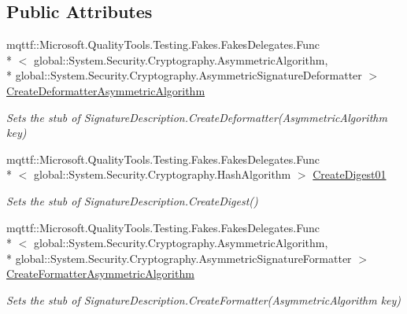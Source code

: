 \subsection*{Public Attributes}
\begin{DoxyCompactItemize}
\item 
mqttf\-::\-Microsoft.\-Quality\-Tools.\-Testing.\-Fakes.\-Fakes\-Delegates.\-Func\\*
$<$ global\-::\-System.\-Security.\-Cryptography.\-Asymmetric\-Algorithm, \\*
global\-::\-System.\-Security.\-Cryptography.\-Asymmetric\-Signature\-Deformatter $>$ \hyperlink{class_system_1_1_security_1_1_cryptography_1_1_fakes_1_1_stub_signature_description_a83e0e5fa60418e395a7f59d61f01202b}{Create\-Deformatter\-Asymmetric\-Algorithm}
\begin{DoxyCompactList}\small\item\em Sets the stub of Signature\-Description.\-Create\-Deformatter(\-Asymmetric\-Algorithm key)\end{DoxyCompactList}\item 
mqttf\-::\-Microsoft.\-Quality\-Tools.\-Testing.\-Fakes.\-Fakes\-Delegates.\-Func\\*
$<$ global\-::\-System.\-Security.\-Cryptography.\-Hash\-Algorithm $>$ \hyperlink{class_system_1_1_security_1_1_cryptography_1_1_fakes_1_1_stub_signature_description_aef788a57d55e71b0c70f314ba74da70d}{Create\-Digest01}
\begin{DoxyCompactList}\small\item\em Sets the stub of Signature\-Description.\-Create\-Digest()\end{DoxyCompactList}\item 
mqttf\-::\-Microsoft.\-Quality\-Tools.\-Testing.\-Fakes.\-Fakes\-Delegates.\-Func\\*
$<$ global\-::\-System.\-Security.\-Cryptography.\-Asymmetric\-Algorithm, \\*
global\-::\-System.\-Security.\-Cryptography.\-Asymmetric\-Signature\-Formatter $>$ \hyperlink{class_system_1_1_security_1_1_cryptography_1_1_fakes_1_1_stub_signature_description_a9e4452ad47edd91e123a848cdbf202e6}{Create\-Formatter\-Asymmetric\-Algorithm}
\begin{DoxyCompactList}\small\item\em Sets the stub of Signature\-Description.\-Create\-Formatter(\-Asymmetric\-Algorithm key)\end{DoxyCompactList}\end{DoxyCompactItemize}
